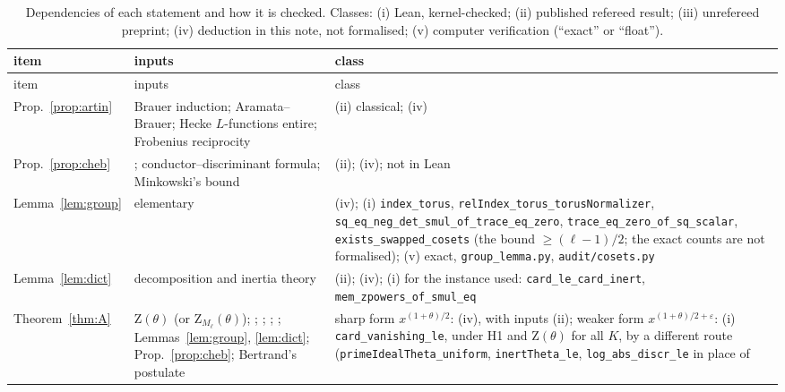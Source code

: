 \documentclass[11pt]{amsart}
\theoremstyle{definition}
\theoremstyle{remark}
\newcommand{\Zt}{\mathrm{Z}}       %
\begin{document}
{\small
\begin{longtable}{@{}>{\raggedright\arraybackslash}p{}>{\raggedright\arraybackslash}p{}>{\raggedright\arraybackslash}p{}@{}}
\caption{Dependencies of each statement and how it is checked. Classes: (i) Lean, kernel-checked; (ii) published
refereed result; (iii) unrefereed preprint; (iv) deduction in this note, not formalised; (v) computer verification
(``exact'' or ``float'').}\label{tab:deps}\\
\toprule
item & inputs & class \\
\midrule
\endfirsthead
\toprule
item & inputs & class \\
\midrule
\endhead
\bottomrule
\endfoot
Prop.~\ref{prop:artin} & Brauer induction; Aramata--Brauer; Hecke $L$-functions entire; Frobenius reciprocity
  & (ii) classical; (iv) \\
Prop.~\ref{prop:cheb} & \cite[Thm.~7.1, Lemma~5.4, \S9]{LO}; conductor--discriminant formula; Minkowski's bound
  & (ii); (iv); not in Lean \\
Lemma~\ref{lem:group} & elementary & (iv); (i) \texttt{index\_\allowbreak{}torus}, \texttt{relIndex\_\allowbreak{}torus\_\allowbreak{}torusNormalizer},
  \texttt{sq\_\allowbreak{}eq\_\allowbreak{}neg\_\allowbreak{}det\_\allowbreak{}smul\_\allowbreak{}of\_\allowbreak{}trace\_\allowbreak{}eq\_\allowbreak{}zero}, \texttt{trace\_\allowbreak{}eq\_\allowbreak{}zero\_\allowbreak{}of\_\allowbreak{}sq\_\allowbreak{}scalar},
  \texttt{exists\_\allowbreak{}swapped\_\allowbreak{}cosets} (the bound $\ge(\ell-1)/2$; the exact counts are not formalised); (v) exact,
  \texttt{group\_\allowbreak{}lemma.py}, \texttt{audit/\allowbreak{}cosets.py} \\
Lemma~\ref{lem:dict} & decomposition and inertia theory & (ii); (iv); (i) for the instance used:
  \texttt{card\_\allowbreak{}le\_\allowbreak{}card\_\allowbreak{}inert}, \texttt{mem\_\allowbreak{}zpowers\_\allowbreak{}of\_\allowbreak{}smul\_\allowbreak{}eq} \\
Theorem~\ref{thm:A} & $\Zt(\theta)$ (or $\Zt_{M_\ell}(\theta)$); \cite{Del71}; \cite{Rib85,Mom81}; \cite{SwD73};
  \cite[Prop.~6]{Serre81}; Lemmas~\ref{lem:group}, \ref{lem:dict}; Prop.~\ref{prop:cheb}; Bertrand's postulate
  & sharp form $x^{(1+\theta)/2}$: (iv), with inputs (ii); weaker form $x^{(1+\theta)/2+\varepsilon}$: (i)
  \texttt{card\_\allowbreak{}vanishing\_\allowbreak{}le}, under H1 and $\Zt(\theta)$ for all $K$, by a different route
  (\texttt{primeIdealTheta\_\allowbreak{}uniform}, \texttt{inertTheta\_\allowbreak{}le}, \texttt{log\_\allowbreak{}abs\_\allowbreak{}discr\_\allowbreak{}le} in place of

\end{longtable}}
\end{document}
